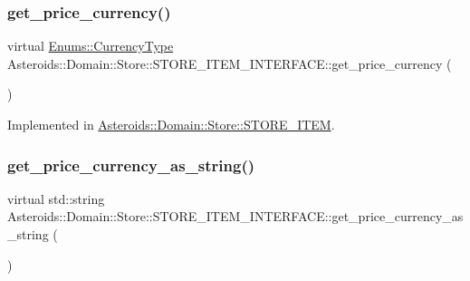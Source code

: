 \subsubsection{\texorpdfstring{get\+\_\+price\+\_\+currency()}{get\_price\_currency()}}
{\footnotesize\ttfamily virtual \hyperlink{namespaceAsteroids_1_1Domain_1_1Store_1_1Enums_a995d66dbd6bc566c0765fdcfd7be6006}{Enums\+::\+Currency\+Type} Asteroids\+::\+Domain\+::\+Store\+::\+S\+T\+O\+R\+E\+\_\+\+I\+T\+E\+M\+\_\+\+I\+N\+T\+E\+R\+F\+A\+C\+E\+::get\+\_\+price\+\_\+currency (\begin{DoxyParamCaption}{ }\end{DoxyParamCaption})\hspace{0.3cm}{\ttfamily [pure virtual]}}



Implemented in \hyperlink{classAsteroids_1_1Domain_1_1Store_1_1STORE__ITEM_abb6f9fd46295bcac9756d4a82d95db47}{Asteroids\+::\+Domain\+::\+Store\+::\+S\+T\+O\+R\+E\+\_\+\+I\+T\+EM}.

\mbox{\label{classAsteroids_1_1Domain_1_1Store_1_1STORE__ITEM__INTERFACE_a914d5fb19a801e397953180f6b115e04}} 
\subsubsection{\texorpdfstring{get\+\_\+price\+\_\+currency\+\_\+as\+\_\+string()}{get\_price\_currency\_as\_string()}}
{\footnotesize\ttfamily virtual std\+::string Asteroids\+::\+Domain\+::\+Store\+::\+S\+T\+O\+R\+E\+\_\+\+I\+T\+E\+M\+\_\+\+I\+N\+T\+E\+R\+F\+A\+C\+E\+::get\+\_\+price\+\_\+currency\+\_\+as\+\_\+string (\begin{DoxyParamCaption}{ }\end{DoxyParamCaption})\hspace{0.3cm}{\ttfamily [pure virtual]}}



